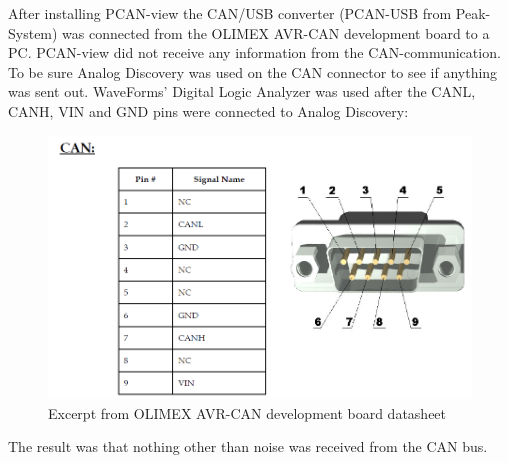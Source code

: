 After installing PCAN-view the CAN/USB converter (PCAN-USB from Peak-System) was connected from the OLIMEX AVR-CAN development board to a PC. PCAN-view did not receive any information from the CAN-communication. To be sure Analog Discovery was used on the CAN connector to see if anything was sent out. WaveForms' Digital Logic Analyzer was used after the CANL, CANH, VIN and GND pins were connected to Analog Discovery:\\
\begin{figure}[H]
	\centering
	\includegraphics[width=0.5\linewidth]{Software/SnipFromOlimexDatasheet.PNG}
	\caption{Excerpt from OLIMEX AVR-CAN development board datasheet}
	\label{fig:OLIMEX_AVR-CAN_BMS}
\end{figure}

The result was that nothing other than noise was received from the CAN bus.


